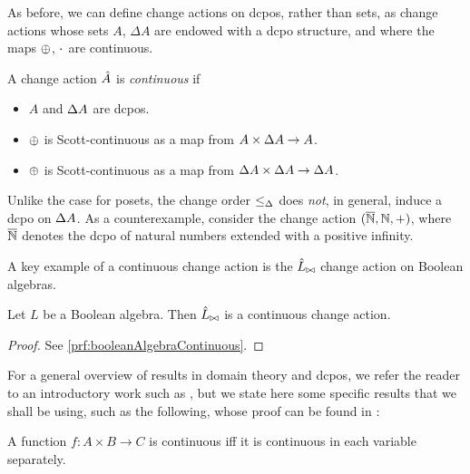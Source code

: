 As before, we can define change actions on dcpos, rather than sets, as change
actions whose sets $A$, $\Delta A$ are endowed with a dcpo structure, and where
the maps $\oplus$, $\cdot$ are continuous.

\begin{defn}
  A change action $\hat{A}$ is \emph{continuous} if
  \begin{itemize}
    \item $A$ and $\Delta A$ are dcpos.
    \item $\oplus$ is Scott-continuous as a map from $A \times \Delta A \rightarrow A$.
    \item $\oplus$ is Scott-continuous as a map from $\Delta A \times \Delta A \rightarrow \Delta A$.
  \end{itemize}
\end{defn}

Unlike the case for posets, the change order $\leq_\Delta$ does \emph{not}, in general,
induce a dcpo on $\Delta A$. As a counterexample, consider 
the change action $(\overline{\mathbb{N}}, \mathbb{N}, +)$, where $\overline{\mathbb{N}}$ denotes the dcpo of natural numbers
extended with a positive infinity.

A key example of a continuous change action is the $\hat{L}_{\bowtie}$ change
action on Boolean algebras.

\begin{prop}[name=Boolean algebra continuity, restate=booleanAlgebraContinuous]
  \label{prop:booleanAlgebraContinuous}
  Let $L$ be a Boolean algebra. Then $\hat{L}_{\bowtie}$ is a continuous
  change action.
\end{prop}
\ifproofs
\begin{proof}
  See \cref{prf:booleanAlgebraContinuous}.
\end{proof}
\fi

For a general overview of results in domain theory and dcpos, we refer the reader to an
introductory work such as \cite{abramsky1994domain}, but we state here some specific results that
we shall be using, such as the following, whose proof can be found in 
\cite[Lemma~3.2.6]{abramsky1994domain}:

\begin{prop}
  \label{prop:distributivityLimit}
  A function $f : A \times B \rightarrow C$ is continuous iff it is continuous in each variable
  separately.
\end{prop}

